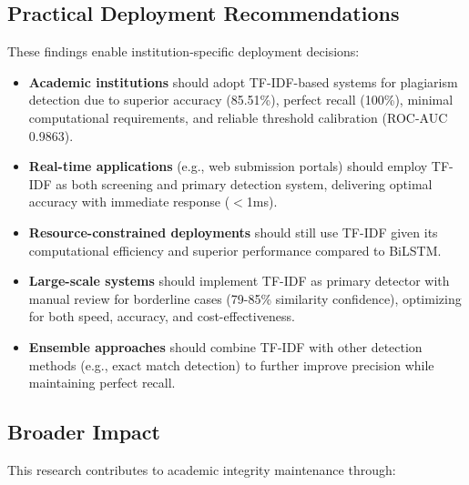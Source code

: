 \subsection{Practical Deployment Recommendations}

These findings enable institution-specific deployment decisions:

\begin{itemize}
  \item \textbf{Academic institutions} should adopt TF-IDF-based systems for plagiarism detection due to superior accuracy (85.51\%), perfect recall (100\%), minimal computational requirements, and reliable threshold calibration (ROC-AUC 0.9863).
  
  \item \textbf{Real-time applications} (e.g., web submission portals) should employ TF-IDF as both screening and primary detection system, delivering optimal accuracy with immediate response ($<$1ms).
  
  \item \textbf{Resource-constrained deployments} should still use TF-IDF given its computational efficiency and superior performance compared to BiLSTM.
  
  \item \textbf{Large-scale systems} should implement TF-IDF as primary detector with manual review for borderline cases (79-85\% similarity confidence), optimizing for both speed, accuracy, and cost-effectiveness.
  
  \item \textbf{Ensemble approaches} should combine TF-IDF with other detection methods (e.g., exact match detection) to further improve precision while maintaining perfect recall.
\end{itemize}

\subsection{Broader Impact}

This research contributes to academic integrity maintenance through:


